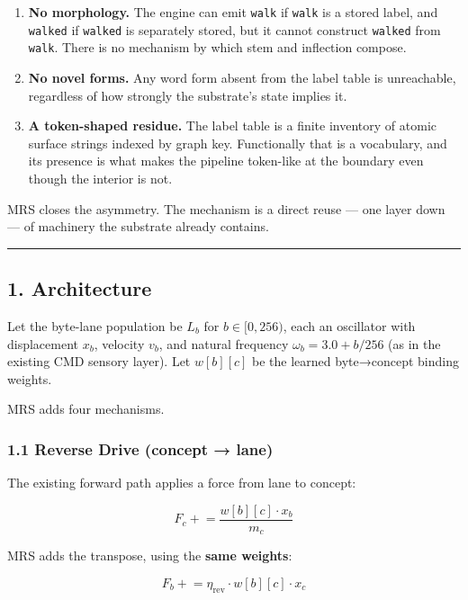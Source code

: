 \documentclass[
  11pt,
  a4paper,
]{article}
\providecommand{\tightlist}{%
  \setlength{\itemsep}{0pt}\setlength{\parskip}{0pt}}
\begin{document}
\begin{enumerate}
\def\labelenumi{\arabic{enumi}.}
\tightlist
\item
  \textbf{No morphology.} The engine can emit \texttt{walk} if
  \texttt{walk} is a stored label, and \texttt{walked} if
  \texttt{walked} is separately stored, but it cannot construct
  \texttt{walked} from \texttt{walk}. There is no mechanism by which
  stem and inflection compose.
\item
  \textbf{No novel forms.} Any word form absent from the label table is
  unreachable, regardless of how strongly the substrate's state implies
  it.
\item
  \textbf{A token-shaped residue.} The label table is a finite inventory
  of atomic surface strings indexed by graph key. Functionally that is a
  vocabulary, and its presence is what makes the pipeline token-like at
  the boundary even though the interior is not.
\end{enumerate}

MRS closes the asymmetry. The mechanism is a direct reuse --- one layer
down --- of machinery the substrate already contains.

\begin{center}\rule{0.5\linewidth}{0.5pt}\end{center}

\subsection{1. Architecture}\label{architecture}

Let the byte-lane population be \(L_b\) for \(b \in [0,256)\), each an
oscillator with displacement \(x_b\), velocity \(v_b\), and natural
frequency \(\omega_b = 3.0 + b/256\) (as in the existing CMD sensory
layer). Let \(w[b][c]\) be the learned byte→concept binding weights.

MRS adds four mechanisms.

\subsubsection{1.1 Reverse Drive (concept →
lane)}\label{reverse-drive-concept-lane}

The existing forward path applies a force from lane to concept:

\[ F_c \mathrel{+}= \frac{w[b][c] \cdot x_b}{m_c} \]

MRS adds the transpose, using the \textbf{same weights}:

\[ F_b \mathrel{+}= \eta_{\text{rev}} \cdot w[b][c] \cdot x_c \]
\end{document}
